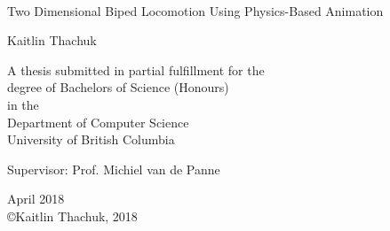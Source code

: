 \documentclass[12pt, a4paper]{article}
\begin{document}
\begin{titlepage}

\centering
\Large

~\vspace{\fill}

{\huge 
Two Dimensional Biped Locomotion Using Physics-Based Animation
}

\vspace{1.5cm}

{\LARGE
Kaitlin Thachuk
}

\vspace{3.0cm}

A thesis submitted in partial fulfillment for the\\
degree of Bachelors of Science (Honours)\\[1em]
in the\\[1em]
Department of Computer Science\\[1em]
University of British Columbia

\vspace{3.0cm}

Supervisor: Prof. Michiel van de Panne

\vspace{\fill}

April 2018\\
\vspace{1.5cm}
{\small \copyright  Kaitlin Thachuk, 2018}

\end{titlepage}
\begin{titlepage}


\begin{abstract}
This project explores locomotion of a biped in two dimensions (2D) using the simple biped locomotion control (SIMBICON) framework. It is meant to be an introduction to the field of physics-based character animation. The project is completed in a newer physics engine PyBullet and the character is represented using MuJoCo XML. The SIMBICON framework includes implementing a basic finite state machine comprised of four states which drive the walking motion of the character. Balance feedback, torso control using the stance leg torque, and ensuring the swing foot placement is unaffected by torso pitch all contribute to achieving a more balanced walk. Torques for all the joints are calculated using proportional-derivative (PD) controllers. Debugging these types of systems often involves many hours of manually searching a parameter space since PyBullet does not have any useful built in tools. The results of this project are a set of target angles, feedback parameters, and gain parameters which are utilized in the main program to produce a character that walks on a plane. These parameters are different from the ones found in the original SIMBICON paper which implies these values may be sensitive to the simulator and character representation used. 
\end{abstract}
\end{titlepage}
\newpage
\end{document}
